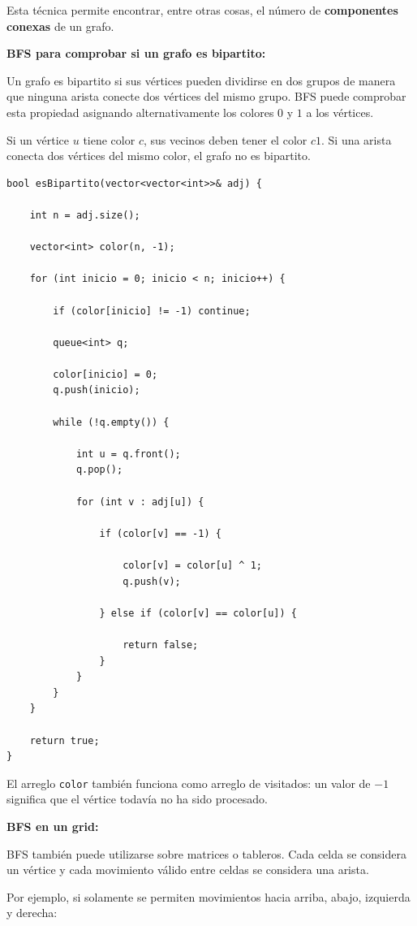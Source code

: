 \documentclass[10pt,a4paper,twocolumn]{article}
\begin{document}
Esta técnica permite encontrar, entre otras cosas, el número de
\textbf{componentes conexas} de un grafo.

\textbf{BFS para comprobar si un grafo es bipartito:}

Un grafo es bipartito si sus vértices pueden dividirse en dos grupos
de manera que ninguna arista conecte dos vértices del mismo grupo.
BFS puede comprobar esta propiedad asignando alternativamente los
colores $0$ y $1$ a los vértices.

Si un vértice $u$ tiene color $c$, sus vecinos deben tener el color
$c \mathbin{\hat{}} 1$. Si una arista conecta dos vértices del mismo
color, el grafo no es bipartito.

\begin{lstlisting}[style=cpp]
bool esBipartito(vector<vector<int>>& adj) {

    int n = adj.size();

    vector<int> color(n, -1);

    for (int inicio = 0; inicio < n; inicio++) {

        if (color[inicio] != -1) continue;

        queue<int> q;

        color[inicio] = 0;
        q.push(inicio);

        while (!q.empty()) {

            int u = q.front();
            q.pop();

            for (int v : adj[u]) {

                if (color[v] == -1) {

                    color[v] = color[u] ^ 1;
                    q.push(v);

                } else if (color[v] == color[u]) {

                    return false;
                }
            }
        }
    }

    return true;
}
\end{lstlisting}

El arreglo \texttt{color} también funciona como arreglo de visitados:
un valor de $-1$ significa que el vértice todavía no ha sido
procesado.

\textbf{BFS en un grid:}

BFS también puede utilizarse sobre matrices o tableros. Cada celda
se considera un vértice y cada movimiento válido entre celdas se
considera una arista.

Por ejemplo, si solamente se permiten movimientos hacia arriba,
abajo, izquierda y derecha:
\end{document}
